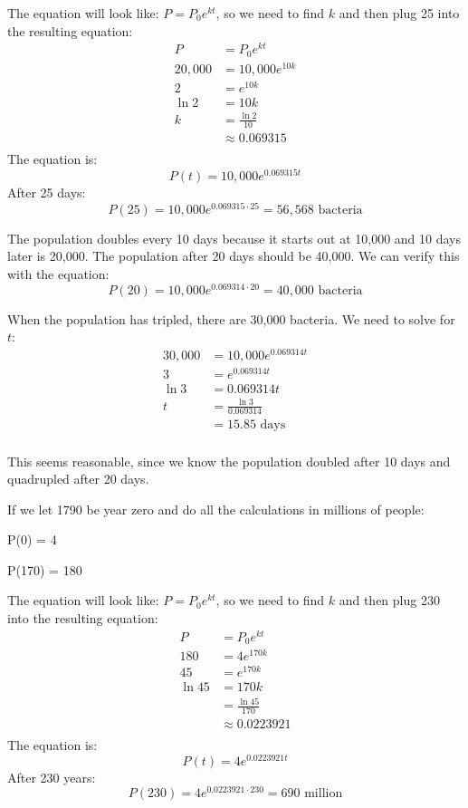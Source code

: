 \documentclass{exam}
\begin{document}
\begin{description}
The equation will look like: $P = P_0 e^{kt}$, so we need to find $k$ and then plug 25 into the resulting equation:
\begin{align*}
  P &= P_0 e^{kt} \\
  20,000 &= 10,000 e^{10k} \\
  2 &= e^{10k} \\
  \ln 2 &= 10 k \\
  k &= \frac{\ln 2}{10} \\
    &\approx 0.069315 \\
\end{align*}
The equation is:
\[
  P(t) = 10,000 e^{0.069315 t}
\]
After 25 days:
\[
  P(25) = 10,000 e^{0.069315 \cdot 25} = 56,568 \text{ bacteria}
\]

\item[6]
The population doubles every 10 days because it starts out at 10,000 and 10 days later is 20,000.  The population after
20 days should be 40,000.  We can verify this with the equation:
\[
  P(20) = 10,000 e^{0.069314 \cdot 20} = 40,000 \text{ bacteria}
\]

\item[7]
When the population has tripled, there are 30,000 bacteria.  We need to solve for $t$:
\begin{align*}
  30,000 &= 10,000 e^{0.069314 t} \\
  3      &= e^{0.069314 t} \\
  \ln 3  &= 0.069314 t \\
  t      &= \frac{\ln 3}{0.069314} \\
         &= 15.85 \text{ days} \\
\end{align*}

This seems reasonable, since we know the population doubled after 10 days and quadrupled after 20 days.

\item[8]
If we let 1790 be year zero and do all the calculations in millions of people:
\begin{itemize*}
  \item P(0) = 4
  \item P(170) = 180
\end{itemize*}

The equation will look like: $P = P_0 e^{kt}$, so we need to find $k$ and then plug 230 into the resulting equation:
\begin{align*}
  P &= P_0 e^{kt} \\
  180 &= 4 e^{170k} \\
  45 &= e^{170k} \\
  \ln 45 &= 170k \\
    &= \frac{\ln 45}{170} \\
    &\approx 0.0223921 \\
\end{align*}
The equation is:
\[
  P(t) = 4 e^{0.0223921 t}
\]
After 230 years:
\[
  P(230) = 4 e^{0.0223921 \cdot 230} = 690 \text{ million}
\]


\end{description}
\end{document}

